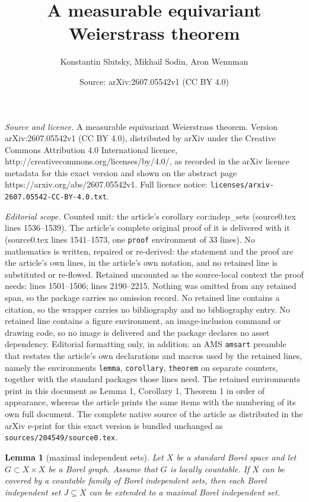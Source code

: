 \documentclass[10pt,a4paper]{amsart}
\title{A measurable equivariant Weierstrass theorem}
\author{Konstantin Slutsky, Mikhail Sodin, Aron Wennman}
\date{Source: arXiv:2607.05542v1 (CC BY 4.0)}
\newtheorem{lemma}{Lemma}
\begin{document}
\maketitle

\noindent\emph{Source and licence.} A measurable equivariant Weierstrass theorem. Version arXiv:2607.05542v1 (CC BY 4.0), distributed by arXiv under the Creative Commons Attribution 4.0 International licence, http://creativecommons.org/licenses/by/4.0/, as recorded in the arXiv licence metadata for this exact version and shown on the abstract page https://arxiv.org/abs/2607.05542v1. Full licence notice: \texttt{licenses/arxiv-2607.05542-CC-BY-4.0.txt}.\par\smallskip

\noindent\textit{Editorial scope.} Counted unit: the article's corollary cor:indep\_sets (source0.tex lines 1536--1539). The article's complete original proof of it is delivered with it (source0.tex lines 1541--1573, one \texttt{proof} environment of 33 lines). No mathematics is written, repaired or re-derived: the statement and the proof are the article's own lines, in the article's own notation, and no retained line is substituted or re-flowed.  Retained uncounted as the source-local context the proof needs: lines 1501--1506; lines 2190--2215.  Nothing was omitted from any retained span, so the package carries no omission record.  No retained line contains a citation, so the wrapper carries no bibliography and no bibliography entry.  No retained line contains a figure environment, an image-inclusion command or drawing code, so no image is delivered and the package declares no asset dependency.  Editorial formatting only, in addition: an AMS \texttt{amsart} preamble that restates the article's own declarations and macros used by the retained lines, namely the environments \texttt{lemma}, \texttt{corollary}, \texttt{theorem} on separate counters, together with the standard packages those lines need.  The retained environments print in this document as Lemma 1, Corollary 1, Theorem 1 in order of appearance, whereas the article prints the same items with the numbering of its own full document.  The complete native source of the article as distributed in the arXiv e-print for this exact version is bundled unchanged as \texttt{sources/204549/source0.tex}.
\begin{lemma}[maximal independent sets]\label{lemma:indep_sets_independent_cover}
Let $X$ be a standard Borel space and let $G\subset X\times X$ be a Borel graph. Assume that
$G$ is locally countable. If \(X\) can be
covered by a countable family of Borel independent sets, then each Borel independent set $J\subseteq X$
can be extended to a maximal Borel independent set.
\end{lemma}
\end{document}
